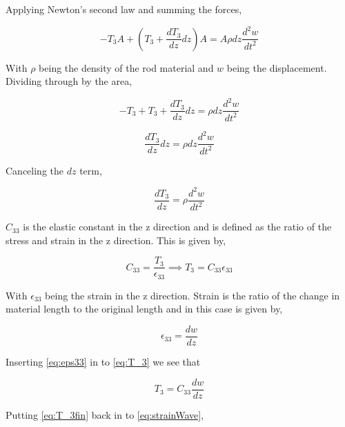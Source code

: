 Applying Newton's second law and summing the forces,

\begin{equation}
-T_3A + (T_3 + \frac{dT_3}{dz}dz)A = A\rho dz \frac{d^2w}{dt^2}
\end{equation}


With $\rho$ being the density of the rod material and $w$ being the displacement. Dividing through by the area,

\begin{equation}
-T_3 + T_3 + \frac{dT_3}{dz}dz = \rho dz \frac{d^2w}{dt^2}
\end{equation}

\begin{equation}
\frac{dT_3}{dz}dz = \rho dz \frac{d^2w}{dt^2}
\end{equation}

Canceling the $dz$ term,

\begin{equation}
\frac{dT_3}{dz} = \rho \frac{d^2w}{dt^2}
\label{eq:strainWave}
\end{equation}

$C_{33}$ is the elastic constant in the z direction and is defined as the ratio of the stress and strain in the z direction. This is given by,

\begin{equation}
C_{33} = \frac{T_3}{\epsilon_{33}} \implies T_3 = C_{33}\epsilon_{33}
\label{eq:T_3}
\end{equation}


With $\epsilon_{33}$ being the strain in the z direction. Strain is the ratio of the change in material length to the original length and in this case is given by,

\begin{equation}
\epsilon_{33} = \frac{dw}{dz}
\label{eq:eps33}
\end{equation}

Inserting \ref{eq:eps33} in to \ref{eq:T_3} we see that

\begin{equation}
T_3 = C_{33}\frac{dw}{dz}
\label{eq:T_3fin}
\end{equation}

Putting \ref{eq:T_3fin} back in to \ref{eq:strainWave},

